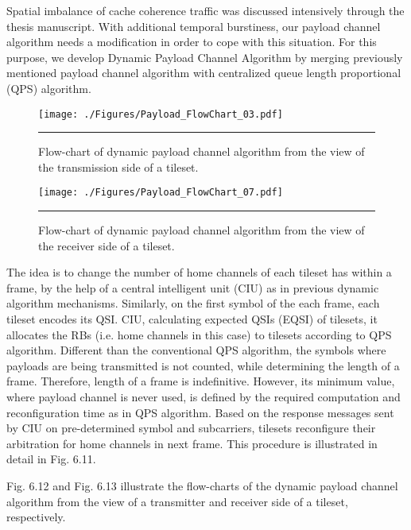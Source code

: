 Spatial imbalance of cache coherence traffic was discussed intensively through the thesis manuscript. With additional temporal burstiness, our payload channel algorithm needs a modification in order to cope with this situation. For this purpose, we develop Dynamic Payload Channel Algorithm by merging previously mentioned payload channel algorithm with centralized queue length proportional (QPS) algorithm. 

\begin{figure}[htbp]
  \centering
    \texttt{[image: ./Figures/Payload\_FlowChart\_03.pdf]}
    \rule{35em}{0.5pt}
  \caption[Flow-chart of dynamic payload channel algorithm from the view of the transmission side of a tileset.]{Flow-chart of dynamic payload channel algorithm from the view of the transmission side of a tileset.} 
  \label{fig:Electron}
\end{figure}

\begin{figure}[htbp]
  \centering
    \texttt{[image: ./Figures/Payload\_FlowChart\_07.pdf]}
    \rule{35em}{0.5pt}
  \caption[Flow-chart of dynamic payload channel algorithm from the view of the receiver side of a tileset.]{Flow-chart of dynamic payload channel algorithm from the view of the receiver side of a tileset.} 
  \label{fig:Electron}
\end{figure}

The idea is to change the number of home channels of each tileset has within a frame, by the help of a central intelligent unit (CIU) as in previous dynamic algorithm mechanisms. Similarly, on the first symbol of the each frame, each tileset encodes its QSI. CIU, calculating expected QSIs (EQSI) of tilesets, it allocates the RBs (i.e. home channels in this case) to tilesets according to QPS algorithm. Different than the conventional QPS algorithm, the symbols where payloads are being transmitted is not counted, while determining the length of a frame. Therefore, length of a frame is indefinitive. However, its minimum value, where payload channel is never used, is defined by the required computation and reconfiguration time as in QPS algorithm. Based on the response messages sent by CIU on pre-determined symbol and subcarriers, tilesets reconfigure their arbitration for home channels in next frame. This procedure is illustrated in detail in Fig. 6.11. 


Fig. 6.12 and Fig. 6.13 illustrate the flow-charts of the dynamic payload channel algorithm from the view of a transmitter and receiver side of a tileset, respectively. 



